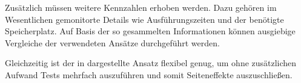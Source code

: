 Zusätzlich müssen weitere Kennzahlen erhoben werden.
Dazu gehören im Wesentlichen gemonitorte Details wie Ausführungszeiten und der benötigte Speicherplatz.
Auf Basis der so gesammelten Informationen können ausgiebige Vergleiche der verwendeten Ansätze durchgeführt werden.

Gleichzeitig ist der in  dargestellte Ansatz flexibel genug,
um ohne zusätzlichen Aufwand Tests mehrfach auszuführen und somit Seiteneffekte auszuschließen.
